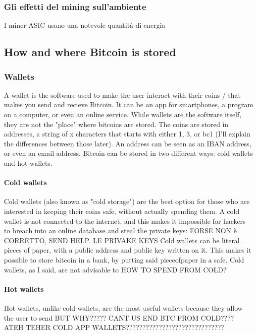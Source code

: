 \documentclass {article}
\begin{document}
\subsubsection {Gli effetti del mining sull'ambiente}


I miner ASIC usano una notevole quantità di energia


\subsection {How and where Bitcoin is stored}


\subsubsection {Wallets}


A wallet is the software used to make the user interact with their coins / that makes you send and recieve Bitcoin. It can be an app for smartphones, a program on a computer, or even an online service.
While wallets are the software itself, they are not the "place" where bitcoins are stored. The coins are stored in addresses, a string of x characters that starts with either 1, 3, or bc1 (I'll explain the differences between those later). An address can be seen as an IBAN address, or even an email address.
Bitcoin can be stored in two different ways: cold wallets and hot wallets.


\paragraph {Cold wallets}


Cold wallets (also known as "cold storage") are the best option for those who are interested in keeping their coins safe, without actually spending them. A cold wallet is not connected to the internet, and this makes it impossible for hackers to breach into an online database and steal the private keys: FORSE NON è CORRETTO, SEND HELP. LE PRIVAKE KEYS 
Cold wallets can be literal pieces of paper, with a public address and public key written on it. This makes it possible to store bitcoin in a bank, by putting said pieceofpaper in a safe.
Cold wallets, as I said, are not advisable to HOW TO SPEND FROM COLD?


\paragraph {Hot wallets}


Hot wallets, unlike cold wallets, are the most useful wallets because they allow the user to send BUT WHY????? CANT US END BTC FROM COLD???? ATEH TEHER COLD APP WALLETS??????????????????????????????
\end{document}
